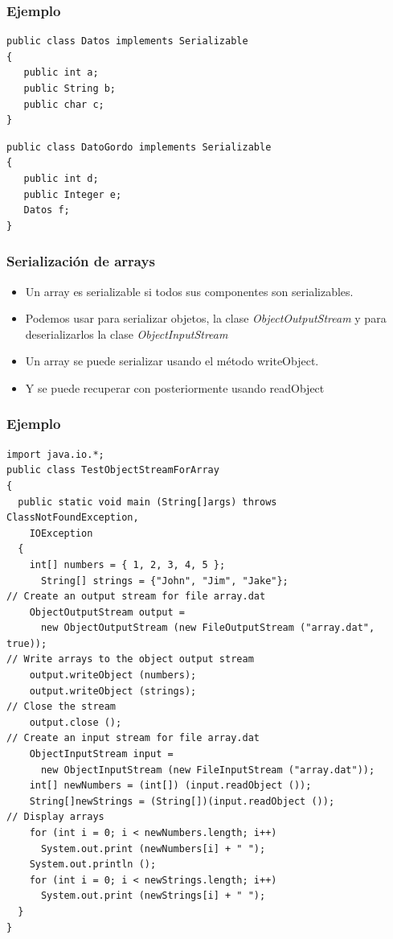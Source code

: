 \documentclass{beamer}
\begin{document}
\begin{frame}[fragile]
\frametitle{Ejemplo}
\begin{verbatim}
public class Datos implements Serializable
{
   public int a;
   public String b;
   public char c;
}
\end{verbatim}
\begin{verbatim}
public class DatoGordo implements Serializable
{
   public int d;
   public Integer e;
   Datos f;
}
\end{verbatim}
\end{frame}

\begin{frame}
\frametitle{Serialización de arrays}
\begin{itemize}[<+->]
\item Un array es serializable si todos sus componentes son serializables.
\item Podemos usar para serializar objetos, la clase \emph{ObjectOutputStream} y para deserializarlos la clase \emph{ObjectInputStream}
\item Un array se puede serializar usando el método \alert{writeObject}.
\item Y se puede recuperar con posteriormente usando \alert{readObject}
\end{itemize}
\end{frame}

\begin{frame}[fragile]
\frametitle{Ejemplo}
\begin{tiny}
\begin{verbatim}
import java.io.*;
public class TestObjectStreamForArray
{
  public static void main (String[]args) throws ClassNotFoundException,
    IOException
  {
    int[] numbers = { 1, 2, 3, 4, 5 };
      String[] strings = {"John", "Jim", "Jake"};
// Create an output stream for file array.dat
    ObjectOutputStream output =
      new ObjectOutputStream (new FileOutputStream ("array.dat", true));
// Write arrays to the object output stream
    output.writeObject (numbers);
    output.writeObject (strings);
// Close the stream
    output.close ();
// Create an input stream for file array.dat
    ObjectInputStream input =
      new ObjectInputStream (new FileInputStream ("array.dat"));
    int[] newNumbers = (int[]) (input.readObject ());
    String[]newStrings = (String[])(input.readObject ());
// Display arrays
    for (int i = 0; i < newNumbers.length; i++)
      System.out.print (newNumbers[i] + " ");
    System.out.println ();
    for (int i = 0; i < newStrings.length; i++)
      System.out.print (newStrings[i] + " ");
  }
}
\end{verbatim}
\end{tiny}
\end{frame}
\end{document}

